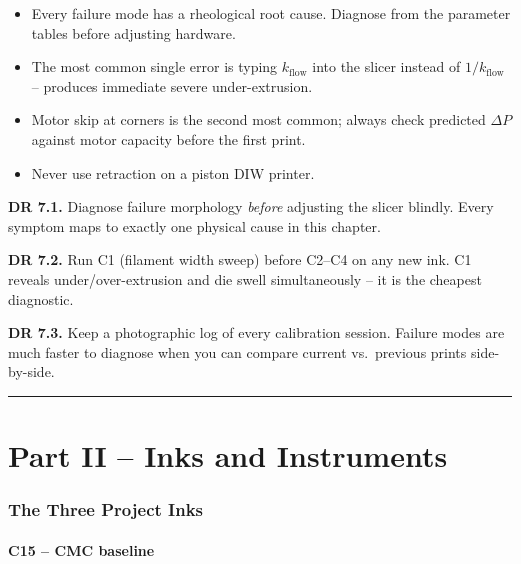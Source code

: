 \documentclass[11pt,a4paper]{article}
\begin{document}
\begin{takeawaybox}
\begin{itemize}[leftmargin=1.4em,itemsep=2pt]
\item Every failure mode has a rheological root cause. Diagnose from
  the parameter tables before adjusting hardware.
\item The most common single error is typing $k_\mathrm{flow}$ into
  the slicer instead of $1/k_\mathrm{flow}$ -- produces immediate
  severe under-extrusion.
\item Motor skip at corners is the second most common; always check
  predicted $\Delta P$ against motor capacity before the first print.
\item Never use retraction on a piston DIW printer.
\end{itemize}
\end{takeawaybox}

\begin{designrulebox}
\textbf{DR 7.1.} Diagnose failure morphology \emph{before} adjusting
the slicer blindly. Every symptom maps to exactly one physical cause in
this chapter.

\textbf{DR 7.2.} Run C1 (filament width sweep) before C2--C4 on any
new ink. C1 reveals under/over-extrusion and die swell simultaneously
-- it is the cheapest diagnostic.

\textbf{DR 7.3.} Keep a photographic log of every calibration session.
Failure modes are much faster to diagnose when you can compare
current vs.\ previous prints side-by-side.
\end{designrulebox}

\bigskip\hrule\bigskip

\part*{Part II -- Inks and Instruments}

\section{The Three Project Inks}
\label{sec:inks}

\subsection{C15 -- CMC baseline}
\end{document}
